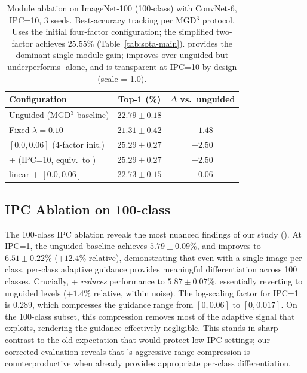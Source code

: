 \begin{table}[t]
\centering
\caption{Module ablation on ImageNet-100 (100-class) with ConvNet-6, IPC=10, 3 seeds. Best-accuracy tracking per MGD$^3$ protocol. Uses the initial four-factor \cags{} configuration; the simplified two-factor \cags{} achieves $25.55\%$ (Table~\ref{tab:sota-main}). \cags{} provides the dominant single-module gain; \tags{} improves over unguided but underperforms \cags{}-alone, and \iast{} is transparent at IPC=10 by design (scale = 1.0).}
\label{tab:module-ablation}
\begin{tabular}{lcc}
\toprule
\textbf{Configuration} & \textbf{Top-1 (\%)} & \textbf{$\Delta$ vs.\ unguided} \\
\midrule
Unguided (MGD$^3$ baseline) & $22.79 \pm 0.18$ & --- \\
Fixed $\lambda = 0.10$ & $21.31 \pm 0.42$ & $-1.48$ \\
\midrule
\cags{} $[0.0, 0.06]$ (4-factor init.) & $\mathbf{25.29 \pm 0.27}$ & $\mathbf{+2.50}$ \\
\iast{} + \cags{} (IPC=10, equiv.\ to \cags{}) & $25.29 \pm 0.27$ & $+2.50$ \\
\tags{} linear + \cags{} $[0.0, 0.06]$ & $22.73 \pm 0.15$ & $-0.06$ \\
\bottomrule
\end{tabular}
\end{table}

\subsection{IPC Ablation on 100-class}
\label{sec:ipc-ablation}

The 100-class IPC ablation reveals the most nuanced findings of our study (). At IPC=1, the unguided baseline achieves $5.79 \pm 0.09\%$, and \cags{} improves to $6.51 \pm 0.22\%$ ($+12.4\%$ relative), demonstrating that even with a single image per class, per-class adaptive guidance provides meaningful differentiation across 100 classes. Crucially, \iast{}+\cags{} \emph{reduces} performance to $5.87 \pm 0.07\%$, essentially reverting to unguided levels ($+1.4\%$ relative, within noise). The \iast{} log-scaling factor for IPC=1 is $0.289$, which compresses the guidance range from $[0, 0.06]$ to $[0, 0.017]$. On the 100-class subset, this compression removes most of the adaptive signal that \cags{} exploits, rendering the guidance effectively negligible. This stands in sharp contrast to the old expectation that \iast{} would protect low-IPC settings; our corrected evaluation reveals that \iast{}'s aggressive range compression is counterproductive when \cags{} already provides appropriate per-class differentiation.

